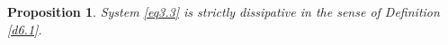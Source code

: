 \documentclass[10pt, a4]{amsart}
\makeatletter
\theoremstyle{plain}
\newtheorem{proposition}[lemma]{Proposition}
\theoremstyle{definition}
\theoremstyle{remark}
\newtheorem{remark}[lemma]{Remark}
\renewenvironment{proof}[1][\proofname]{\par
  \pushQED{\qed}%
  \normalfont \topsep6\p@\@plus6\p@\relax
  \trivlist
  \item[\hskip\labelsep
        \itshape
    #1\ \ref{#1}.]\ignorespaces
}{%
  \popQED\endtrivlist\@endpefalse
}
\numberwithin{equation}{section}
\makeatother
\begin{document}
\begin{proposition}\label{p6.2}
System \eqref{eq3.3} is strictly dissipative in the sense of Definition \ref{d6.1}.
\end{proposition}
\end{document}
